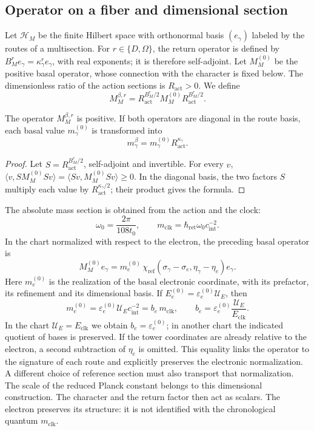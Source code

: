 \subsection{Operator on a fiber and dimensional section}

Let \(\mathscr H_M\) be the finite Hilbert space with orthonormal basis
\((e_\gamma)\) labeled by the routes of a multisection. For
\(r\in\{D,\Omega\}\), the return operator is defined by
\(B_M^re_\gamma=\kappa_\gamma^re_\gamma\), with real exponents;
it is therefore self-adjoint. Let \(M_M^{(0)}\) be the positive basal operator,
whose connection with the character is fixed below.
The dimensionless ratio of the
action sections is \(R_{\mathrm{act}}>0\). We define
\[
 M_M^{\beta,r}=R_{\mathrm{act}}^{B_M^r/2}
 M_M^{(0)}R_{\mathrm{act}}^{B_M^r/2}.
\]

\begin{proposition}
The operator \(M_M^{\beta,r}\) is positive. If both operators are
diagonal in the route basis, each basal value \(m_\gamma^{(0)}\)
is transformed into
\[
 m_\gamma^\beta=m_\gamma^{(0)}R_{\mathrm{act}}^{\kappa_\gamma}.
\]
\end{proposition}
\begin{proof}
Let \(S=R_{\mathrm{act}}^{B_M^r/2}\), self-adjoint and invertible.
For every \(v\),
\(\langle v,SM_M^{(0)}Sv\rangle=\langle Sv,M_M^{(0)}Sv\rangle\ge0\).
In the diagonal basis, the two factors \(S\) multiply each value
by \(R_{\mathrm{act}}^{\kappa_\gamma/2}\); their product gives the formula.
\end{proof}

The absolute mass section is obtained from the action and the clock:
\[
 \omega_0=\frac{2\pi}{108t_0},\qquad
m_{\mathrm{clk}}=\hbar_{\mathrm{ret}}\omega_0c_{\mathrm{int}}^{-2}.
\]
In the chart normalized with respect to the electron, the preceding basal operator is
\[
 M_M^{(0)}e_\gamma
 =m_e^{(0)}\,
   \chi_{\mathrm{ref}}(\sigma_\gamma-\sigma_e,
                       \eta_\gamma-\eta_e)e_\gamma.
\]
Here \(m_e^{(0)}\) is the realization of the basal electronic
coordinate, with its prefactor, its refinement and its dimensional basis.
If \(E_e^{(0)}=\varepsilon_e^{(0)}\mathcal U_E\), then
\[
 m_e^{(0)}=\varepsilon_e^{(0)}\mathcal U_Ec_{\mathrm{int}}^{-2}
 =b_e\,m_{\mathrm{clk}},\qquad
 b_e=\varepsilon_e^{(0)}\frac{\mathcal U_E}{E_{\mathrm{clk}}}.
\]
In the chart \(\mathcal U_E=E_{\mathrm{clk}}\) we obtain
\(b_e=\varepsilon_e^{(0)}\); in another chart the indicated quotient
of bases is preserved. If the tower coordinates are already
relative to the electron, a second subtraction of \(\eta_e\) is omitted.
This equality links the operator to the signature of each route and explicitly
preserves the electronic normalization. A different choice of
reference section must also transport that normalization.
The scale of the reduced Planck constant belongs to this dimensional
construction. The character and the return factor then act as
scalars. The electron preserves its structure: it is not identified with the
chronological quantum \(m_{\mathrm{clk}}\).


